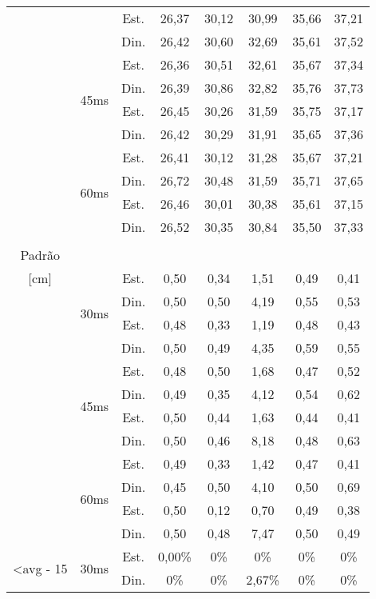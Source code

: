 \begin{center}
\begin{longtable}{|c|c|c|ccccc|}
 &  & Est. & 26,37 & 30,12 & 30,99 & 35,66 & 37,21 \\
 &  & Din. & 26,42 & 30,60 & 32,69 & 35,61 & 37,52 \\ \cline{2-8} 
 & \multirow{4}{*}{45ms} & Est. & 26,36 & 30,51 & 32,61 & 35,67 & 37,34 \\
 &  & Din. & 26,39 & 30,86 & 32,82 & 35,76 & 37,73 \\
 &  & Est. & 26,45 & 30,26 & 31,59 & 35,75 & 37,17 \\
 &  & Din. & 26,42 & 30,29 & 31,91 & 35,65 & 37,36 \\ \cline{2-8} 
 & \multirow{4}{*}{60ms} & Est. & 26,41 & 30,12 & 31,28 & 35,67 & 37,21 \\
 &  & Din. & 26,72 & 30,48 & 31,59 & 35,71 & 37,65 \\
 &  & Est. & 26,46 & 30,01 & 30,38 & 35,61 & 37,15 \\
 &  & Din. & 26,52 & 30,35 & 30,84 & 35,50 & 37,33 \\ \hline \pagebreak
\multirow{12}{*}{\begin{tabular}[c]{@{}c@{}}Desvio\\ Padrão\\ {[}cm{]}\end{tabular}} & \multirow{4}{*}{30ms} & Est. & 0,50 & 0,34 & 1,51 & 0,49 & 0,41 \\
 &  & Din. & 0,50 & 0,50 & 4,19 & 0,55 & 0,53 \\
 &  & Est. & 0,48 & 0,33 & 1,19 & 0,48 & 0,43 \\
 &  & Din. & 0,50 & 0,49 & 4,35 & 0,59 & 0,55 \\ \cline{2-8} 
 & \multirow{4}{*}{45ms} & Est. & 0,48 & 0,50 & 1,68 & 0,47 & 0,52 \\
 &  & Din. & 0,49 & 0,35 & 4,12 & 0,54 & 0,62 \\
 &  & Est. & 0,50 & 0,44 & 1,63 & 0,44 & 0,41 \\
 &  & Din. & 0,50 & 0,46 & 8,18 & 0,48 & 0,63 \\ \cline{2-8} 
 & \multirow{4}{*}{60ms} & Est. & 0,49 & 0,33 & 1,42 & 0,47 & 0,41 \\
 &  & Din. & 0,45 & 0,50 & 4,10 & 0,50 & 0,69 \\
 &  & Est. & 0,50 & 0,12 & 0,70 & 0,49 & 0,38 \\
 &  & Din. & 0,50 & 0,48 & 7,47 & 0,50 & 0,49 \\ \hline
\multirow{12}{*}{\textless avg - 15} & \multirow{4}{*}{30ms} & Est. & 0,00\% & 0\% & 0\% & 0\% & 0\% \\
 &  & Din. & 0\% & 0\% & 2,67\% & 0\% & 0\% \\

\end{longtable}
\end{center}
